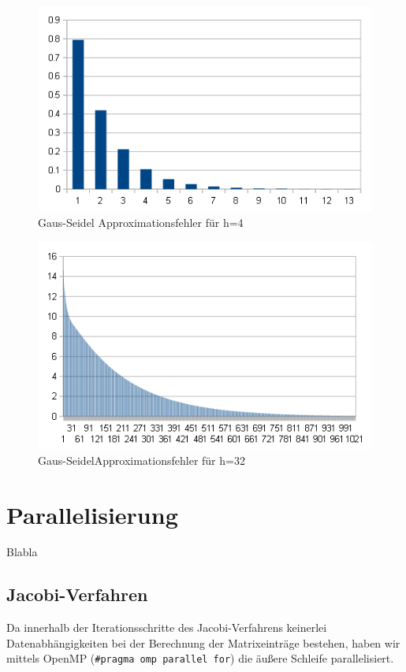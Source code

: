 \documentclass{article}
\begin{document}
\begin{figure}[htbp] 
  \centering
     \includegraphics[width=1\textwidth]{bilder/dgs4.png}
  \caption{Gaus-Seidel Approximationsfehler für h=4}
  \label{fig:Bild4}
\end{figure}
\begin{figure}[htbp] 
  \centering
     \includegraphics[width=1\textwidth]{bilder/dgs32.png}
  \caption{Gaus-SeidelApproximationsfehler für h=32}
  \label{fig:Bild5}
\end{figure}
\section{Parallelisierung}
Blabla
\subsection{Jacobi-Verfahren} \label{parallel:jacobi}
Da innerhalb der Iterationsschritte des Jacobi-Verfahrens keinerlei Datenabhängigkeiten bei der Berechnung der Matrixeinträge bestehen, haben wir mittels OpenMP (\texttt{\#pragma omp parallel for}) die äußere Schleife parallelisiert.
\end{document}
